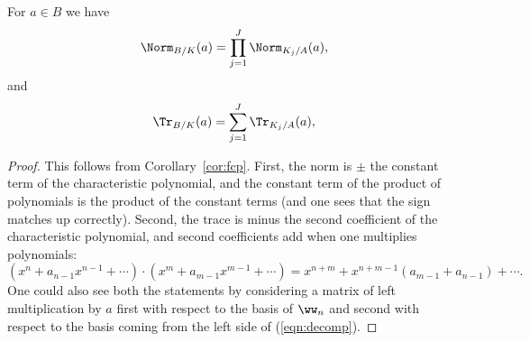 \documentclass[11pt]{book}
\begin{document}
\begin{ch}
\begin{corollary}
For $a\in B$ we have
$$
 \Norm_{B/K}(a) = \prod_{j=1}^J \Norm_{K_j/A}(a),
$$
and
$$
 \Tr_{B/K}(a) = \sum_{j=1}^J \Tr_{K_j/A}(a),
$$
\end{corollary}
\begin{proof}
  This follows from Corollary~\ref{cor:fcp}.  First, the norm is $\pm$
  the constant term of the characteristic polynomial, and the constant
  term of the product of polynomials is the product of the constant
  terms (and one sees that the sign matches up correctly).  Second,
  the trace is minus the second coefficient of the characteristic
  polynomial, and second coefficients add when one multiplies
  polynomials:
  $$
  (x^n + a_{n-1}x^{n-1} + \cdots ) \cdot (x^m + a_{m-1}x^{m-1} +
  \cdots ) = x^{n+m} + x^{n+m-1} (a_{m-1} + a_{n-1}) + \cdots.
  $$
  One could also see both the statements by considering a matrix of
  left multiplication by $a$ first with respect to the basis of
  $\ww_n$ and second with respect to the basis coming from the left
  side of (\ref{eqn:decomp}).

\end{proof}
\end{ch}
\end{document}
